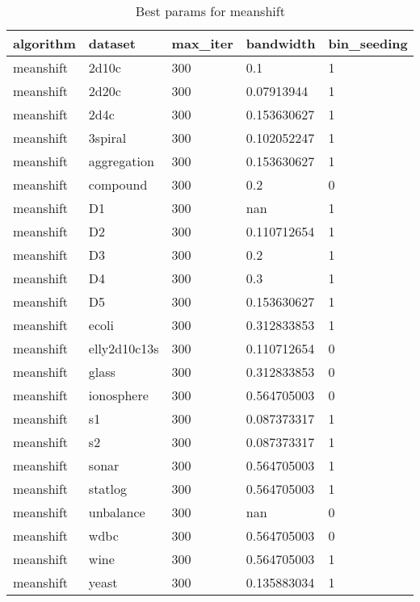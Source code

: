 \begin{table}[H]
\centering
\caption{Best params for meanshift}
\label{S35_Table}
\begin{tabular}{|l|l|l|l|l|}
\hline
algorithm & dataset & max\_iter & bandwidth & bin\_seeding \\
\hline
meanshift & 2d10c & 300 & 0.1 & 1 \\
\hline
meanshift & 2d20c & 300 & 0.07913944 & 1 \\
\hline
meanshift & 2d4c & 300 & 0.153630627 & 1 \\
\hline
meanshift & 3spiral & 300 & 0.102052247 & 1 \\
\hline
meanshift & aggregation & 300 & 0.153630627 & 1 \\
\hline
meanshift & compound & 300 & 0.2 & 0 \\
\hline
meanshift & D1 & 300 & nan & 1 \\
\hline
meanshift & D2 & 300 & 0.110712654 & 1 \\
\hline
meanshift & D3 & 300 & 0.2 & 1 \\
\hline
meanshift & D4 & 300 & 0.3 & 1 \\
\hline
meanshift & D5 & 300 & 0.153630627 & 1 \\
\hline
meanshift & ecoli & 300 & 0.312833853 & 1 \\
\hline
meanshift & elly2d10c13s & 300 & 0.110712654 & 0 \\
\hline
meanshift & glass & 300 & 0.312833853 & 0 \\
\hline
meanshift & ionosphere & 300 & 0.564705003 & 0 \\
\hline
meanshift & s1 & 300 & 0.087373317 & 1 \\
\hline
meanshift & s2 & 300 & 0.087373317 & 1 \\
\hline
meanshift & sonar & 300 & 0.564705003 & 1 \\
\hline
meanshift & statlog & 300 & 0.564705003 & 1 \\
\hline
meanshift & unbalance & 300 & nan & 0 \\
\hline
meanshift & wdbc & 300 & 0.564705003 & 0 \\
\hline
meanshift & wine & 300 & 0.564705003 & 1 \\
\hline
meanshift & yeast & 300 & 0.135883034 & 1 \\
\hline
\end{tabular}
\end{table}

\clearpage

